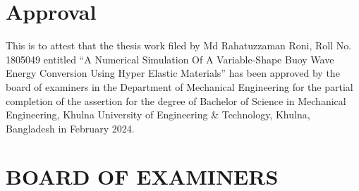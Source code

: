 \documentclass{article}
\begin{document}
\section*{\centering\fontsize{14}{16}\selectfont Approval}
\vspace{2\baselineskip}
{\justifying\fontsize{12}{14}\selectfont %
This is to attest that the thesis work filed by Md Rahatuzzaman Roni, Roll No. 1805049 entitled “A Numerical Simulation Of A Variable-Shape Buoy Wave Energy Conversion Using Hyper Elastic Materials” has been approved by the board of examiners in the Department of Mechanical Engineering for the partial completion of the assertion for the degree of Bachelor of Science in Mechanical Engineering, Khulna University of Engineering \& Technology, Khulna, Bangladesh in February 2024.
\par %
}
\vspace{3\baselineskip}
\section*{\centering\fontsize{14}{16}\selectfont BOARD OF EXAMINERS}
\vspace{3\baselineskip}
\end{document}

